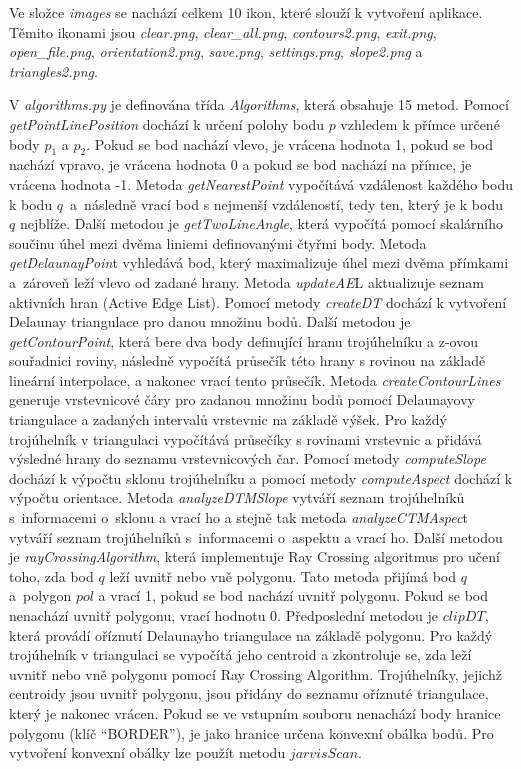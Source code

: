 \documentclass{article}
\begin{document}
\begin{spacing}{1.5}
Ve složce \textit{images} se nachází celkem 10 ikon, které slouží k vytvoření aplikace. Těmito ikonami jsou \textit{clear.png}, \textit{clear\_all.png}, \textit{contours2.png}, \textit{exit.png}, \textit{open\_file.png}, \textit{orientation2.png}, \textit{save.png}, \textit{settings.png}, \textit{slope2.png} a \textit{triangles2.png}.

V \textit{algorithms.py} je definována třída \textit{Algorithms}, která obsahuje 15 metod. Pomocí \textit{getPointLinePosition} dochází k určení polohy bodu $p$ vzhledem k přímce určené body $p_1$ a $p_2$. Pokud se bod nachází vlevo, je vrácena hodnota 1, pokud se bod nachází vpravo, je vrácena hodnota 0 a pokud se bod nachází na přímce, je vrácena hodnota -1. Metoda \textit{getNearestPoint} vypočítává vzdálenost každého bodu k bodu $q$~a~následně vrací bod s nejmenší vzdáleností, tedy ten, který je k bodu $q$ nejblíže. Další metodou je \textit{getTwoLineAngle}, která vypočítá pomocí skalárního součinu úhel mezi dvěma liniemi definovanými čtyřmi body. Metoda \textit{getDelaunayPoin}t vyhledává bod, který maximalizuje úhel mezi dvěma přímkami a~zároveň leží vlevo od zadané hrany. Metoda \textit{updateAE}L aktualizuje seznam aktivních hran (Active Edge List). Pomocí metody \textit{createDT} dochází k vytvoření Delaunay triangulace pro danou množinu bodů. Další metodou je \textit{getContourPoint}, která bere dva body definující hranu trojúhelníku a z-ovou souřadnici roviny, následně vypočítá průsečík této hrany s rovinou na základě lineární interpolace, a nakonec vrací tento průsečík. Metoda \textit{createContourLines} generuje vrstevnicové čáry pro zadanou množinu bodů pomocí Delaunayovy triangulace a zadaných intervalů vrstevnic na základě výšek. Pro každý trojúhelník v triangulaci vypočítává průsečíky s rovinami vrstevnic a přidává výsledné hrany do seznamu vrstevnicových čar. Pomocí metody \textit{computeSlope} dochází k výpočtu sklonu trojúhelníku a pomocí metody \textit{computeAspect} dochází k výpočtu orientace. Metoda \textit{analyzeDTMSlope} vytváří seznam trojúhelníků s~informacemi o~sklonu a vrací ho a stejně tak metoda \textit{analyzeCTMAspec}t vytváří seznam trojúhelníků s~informacemi o~aspektu a vrací ho. Další metodou je \textit{rayCrossingAlgorithm}, která implementuje Ray Crossing algoritmus pro učení toho, zda bod $q$ leží uvnitř nebo vně polygonu. Tato metoda přijímá bod $q$ a~polygon $pol$ a vrací 1, pokud se bod nachází uvnitř polygonu. Pokud se bod nenachází uvnitř polygonu, vrací hodnotu 0. Předposlední metodou je $clipDT$, která provádí oříznutí Delaunayho triangulace na základě polygonu. Pro každý trojúhelník v triangulaci se vypočítá jeho centroid a zkontroluje se, zda leží uvnitř nebo vně polygonu pomocí Ray Crossing Algorithm. Trojúhelníky, jejichž centroidy jsou uvnitř polygonu, jsou přidány do seznamu oříznuté triangulace, který je nakonec vrácen. Pokud se ve vstupním souboru nenachází body hranice polygonu (klíč “BORDER”), je jako hranice určena konvexní obálka bodů. Pro vytvoření konvexní obálky lze použít metodu $jarvisScan$.


\end{spacing}
\end{document}
